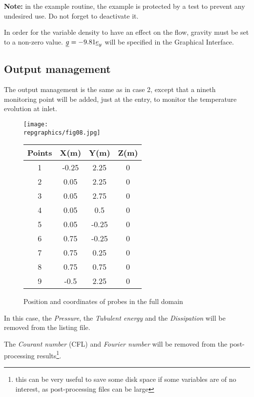 \textbf{Note:} in the example routine, the example is protected by a test to prevent any
undesired use. Do not forget to deactivate it.

In order for the variable density to have an effect on the flow, gravity must be
set to a non-zero value. $\underline{g} = -9.81 \underline{e}_y$ will be specified in the
Graphical Interface.
	
	\subsection{Output management}

The output management is the same as in case 2, except that a nineth monitoring
point will be added, just at the entry, to monitor the temperature evolution at inlet.

\begin{figure}[htp]
\parbox{8cm}{%
\centerline{\texttt{[image: \\repgraphics/fig08.jpg]}}}
\parbox{7cm}{%
\begin{center}
\begin{tabular}{|c|c|c|c|}
\hline
Points & X(m) & Y(m) & Z(m)\\
\hline
1 & -0.25 & 2.25 & 0 \\
\hline
2 & 0.05 & 2.25 & 0 \\
\hline
3 & 0.05 & 2.75 & 0 \\
\hline
4 & 0.05 & 0.5 & 0 \\
\hline
5 & 0.05 & -0.25 & 0 \\
\hline
6 & 0.75 & -0.25 & 0 \\
\hline
7 & 0.75 & 0.25 & 0 \\
\hline
8 & 0.75 & 0.75 & 0 \\
\hline
9 & -0.5 & 2.25 & 0 \\
\hline
\end{tabular}
\end{center}
}
\caption{Position and coordinates of probes in the full domain}
\label{figante32}
\end{figure}

In this case, the {\itshape Pressure}, the {\itshape Tubulent energy} and the
{\itshape Dissipation} will be removed from the listing file.

The {\itshape Courant number} (CFL) and {\itshape Fourier number} will be
removed from the 
post-processing results\footnote{this can be very useful to save some disk space
if some variables are of no interest, as post-processing files can be large}.

